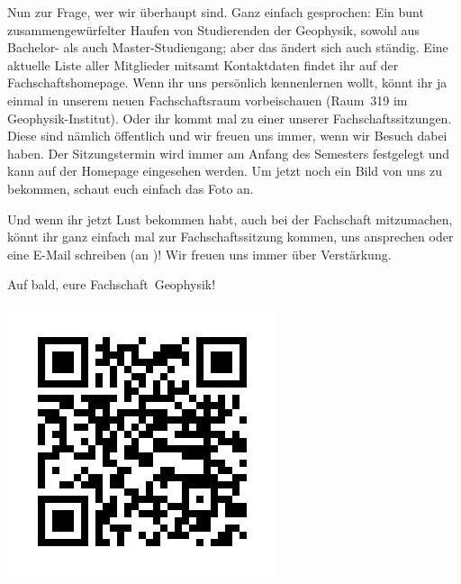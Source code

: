 \begin{multicols*}{2}
Nun zur Frage, wer wir überhaupt sind.
Ganz einfach gesprochen:
Ein bunt zusammengewürfelter Haufen von Studierenden der Geophysik, sowohl aus Bachelor- als auch Master-Studiengang; aber das ändert sich auch ständig.
Eine aktuelle Liste aller Mitglieder mitsamt Kontaktdaten findet ihr auf der Fachschaftshomepage.
Wenn ihr uns persönlich kennenlernen wollt, könnt ihr ja einmal in unserem neuen Fachschaftsraum vorbeischauen (Raum~319 im Geophysik-Institut).
Oder ihr kommt mal zu einer unserer Fachschaftssitzungen.
Diese sind nämlich öffentlich und wir freuen uns immer, wenn wir Besuch dabei haben.
Der Sitzungstermin wird immer am Anfang des Semesters festgelegt und kann auf der Homepage eingesehen werden.
Um jetzt noch ein Bild von uns zu bekommen, schaut euch einfach das Foto an.

Und wenn ihr jetzt Lust bekommen habt, auch bei der Fachschaft mitzumachen, könnt ihr ganz einfach mal zur Fachschaftssitzung kommen, uns ansprechen oder eine E-Mail schreiben (an )!
Wir freuen uns immer über Verstärkung.

Auf bald, eure Fachschaft~Geophysik!



\begin{center}
	\includegraphics[width=0.5\columnwidth]{res/FS_Geophysik_QR_Insta2025.png}
\end{center}
\end{multicols*}


